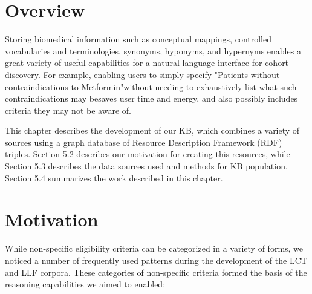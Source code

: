\documentclass[../main.tex]{subfiles}
\begin{document}


\section{Overview}

Storing biomedical information such as conceptual mappings, controlled vocabularies and terminologies, synonyms, hyponyms, and hypernyms enables a great variety of useful capabilities for a natural language interface for cohort discovery. For example, enabling users to simply specify "Patients without contraindications to Metformin"\textemdash without needing to exhaustively list what such contraindications may be\textemdash saves user time and energy, and also possibly includes criteria they may not be aware of.  

This chapter describes the development of our KB, which combines a variety of sources using a graph database of Resource Description Framework (RDF) \cite{manola2004rdf} triples. Section 5.2 describes our motivation for creating this resources, while Section 5.3 describes the data sources used and methods for KB population. Section 5.4 summarizes the work described in this chapter.

\section{Motivation}

While non-specific eligibility criteria can be categorized in a variety of forms, we noticed a number of frequently used patterns during the development of the LCT and LLF corpora. These categories of non-specific criteria formed the basis of the reasoning capabilities we aimed to enabled:
\end{document}
